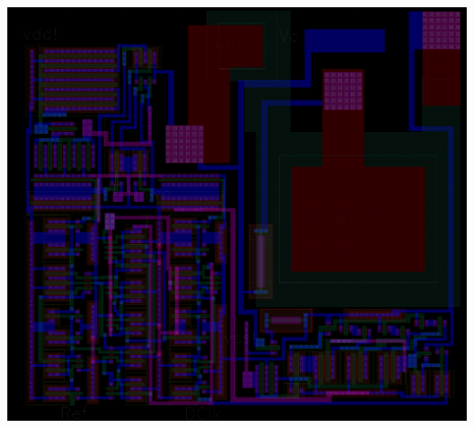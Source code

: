 \documentclass{article}
\begin{document}
\vspace{-2in}
\begin{minipage}{28in}
\centering
\includegraphics[width=31in,set height=22.75in,lap=-2in]{figure.png}
\end{minipage}
\end{document}
